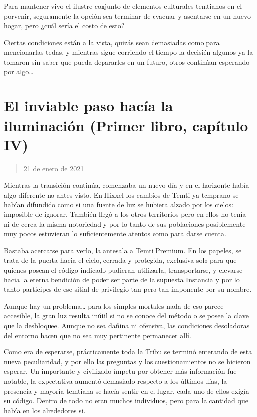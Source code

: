 \documentclass[
]{book}
\begin{document}
Para mantener vivo el ilustre conjunto de elementos culturales temtianos en el porvenir, seguramente la opción sea terminar de evacuar y asentarse en un nuevo hogar, pero ¿cuál sería el costo de esto?

Ciertas condiciones están a la vista, quizás sean demasiadas como para mencionarlas todas, y mientras sigue corriendo el tiempo la decisión algunos ya la tomaron sin saber que pueda depararles en un futuro, otros continúan esperando por algo\ldots{}

\hypertarget{el-inviable-paso-hacuxeda-la-iluminaciuxf3n-primer-libro-capuxedtulo-iv}{%
\section{El inviable paso hacía la iluminación (Primer libro, capítulo IV)}\label{el-inviable-paso-hacuxeda-la-iluminaciuxf3n-primer-libro-capuxedtulo-iv}}

\begin{quote}
21 de enero de 2021
\end{quote}

Mientras la transición continúa, comenzaba un nuevo día y en el horizonte había algo diferente no antes visto. En Hixxel los cambios de Temti ya temprano se habían difundido como si una fuente de luz se hubiera alzado por los cielos: imposible de ignorar. También llegó a los otros territorios pero en ellos no tenía ni de cerca la misma notoriedad y por lo tanto de sus poblaciones posiblemente muy pocos estuvieran lo suficientemente atentos como para darse cuenta.

Bastaba acercarse para verlo, la antesala a Temti Premium. En los papeles, se trata de la puerta hacia el cielo, cerrada y protegida, exclusiva solo para que quienes posean el código indicado pudieran utilizarla, transportarse, y elevarse hacía la eterna bendición de poder ser parte de la supuesta Instancia y por lo tanto participes de ese sitial de privilegio tan pero tan imponente por su nombre.

Aunque hay un problema\ldots{} para los simples mortales nada de eso parece accesible, la gran luz resulta inútil si no se conoce del método o se posee la clave que la desbloquee. Aunque no sea dañina ni ofensiva, las condiciones desoladoras del entorno hacen que no sea muy pertinente permanecer allí.

Como era de esperarse, prácticamente toda la Tribu se terminó enterando de esta nueva peculiaridad, y por ello las preguntas y los cuestionamientos no se hicieron esperar. Un importante y civilizado ímpetu por obtener más información fue notable, la expectativa aumentó demasiado respecto a los últimos días, la presencia y mayoría temtiana se hacía sentir en el lugar, cada uno de ellos exigía su código. Dentro de todo no eran muchos individuos, pero para la cantidad que había en los alrededores si.
\end{document}
